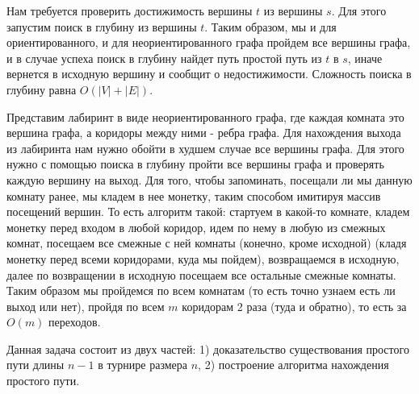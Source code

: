 \documentclass[12pt]{extreport}
\theoremstyle{definition}
\theoremstyle{definition}
\begin{document}
\Pr \hspace{1mm} Нам требуется проверить достижимость вершины $t$ из вершины $s$. Для этого запустим поиск в глубину из вершины $t$. Таким образом, мы и для ориентированного, и для неориентированного графа пройдем все вершины графа, и в случае успеха поиск в глубину найдет путь простой путь из $t$ в $s$, иначе вернется в исходную вершину и сообщит о недостижимости. Сложность поиска в глубину равна $O(|V|+|E|)$.

\Pr \hspace{1mm} Представим лабиринт в виде неориентированного графа, где каждая комната это вершина графа, а коридоры между ними - ребра графа. Для нахождения выхода из лабиринта нам нужно обойти в худшем случае все вершины графа. Для этого нужно с помощью поиска в глубину пройти все вершины графа и проверять каждую вершину на выход. Для того, чтобы запоминать, посещали ли мы данную комнату ранее, мы кладем в нее монетку, таким способом имитируя массив посещений вершин. То есть алгоритм такой: стартуем в какой-то комнате, кладем монетку перед входом в любой коридор, идем по нему в любую из смежных комнат, посещаем все смежные с ней комнаты (конечно, кроме исходной) (кладя монетку перед всеми коридорами, куда мы пойдем), возвращаемся в исходную, далее по возвращении в исходную посещаем все остальные смежные комнаты. Таким образом мы пройдемся по всем комнатам (то есть точно узнаем есть ли выход или нет), пройдя по всем $m$ коридорам 2 раза (туда и обратно), то есть за $O(m)$ переходов.

\Pr \hspace{1mm} Данная задача состоит из двух частей: 1) доказательство существования простого пути длины $n-1$ в турнире размера  $n$, 2) построение алгоритма нахождения простого пути.
\end{document}
